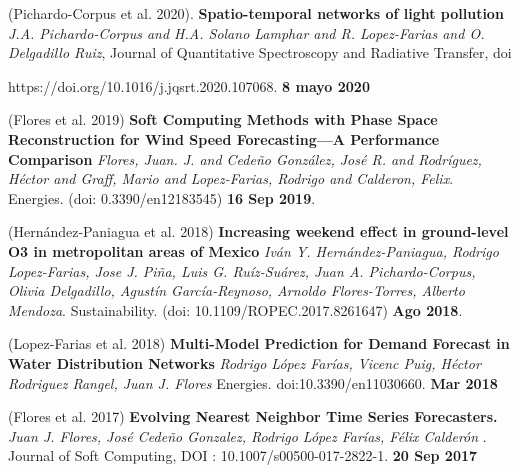 \documentclass[10pt]{article}
\newenvironment{innerlist}[1][\enskip\textbullet]%
        {\begin{compactitem}[#1]}{\end{compactitem}}
\begin{document}
\begin{innerlist}

\item (Pichardo-Corpus et al. 2020). \textbf{Spatio-temporal networks of light pollution} \textit{J.A. Pichardo-Corpus and H.A. Solano Lamphar and R. Lopez-Farias and O. Delgadillo Ruiz}, Journal of Quantitative Spectroscopy and Radiative Transfer, doi 

https://doi.org/10.1016/j.jqsrt.2020.107068. \textbf{8 mayo 2020}

\item (Flores et al. 2019) \textbf{Soft Computing Methods with Phase Space Reconstruction for Wind Speed Forecasting—A Performance Comparison} \textit{{Flores, Juan. J. and Cedeño González, José R. and Rodríguez, Héctor and Graff, Mario and Lopez-Farias, Rodrigo and Calderon, Felix}}. {Energies}. (doi: 0.3390/en12183545) \textbf{16 Sep 2019}.

\item (Hernández-Paniagua et al. 2018) \textbf{Increasing weekend effect in ground-level O3 in metropolitan areas of Mexico} \textit{Iván Y. Hernández-Paniagua, Rodrigo Lopez-Farias, Jose J. Piña, Luis G. Ruíz-Suárez, Juan A. Pichardo-Corpus, Olivia Delgadillo, Agustín García-Reynoso, Arnoldo Flores-Torres, Alberto Mendoza}. {Sustainability}. (doi: 10.1109/ROPEC.2017.8261647) \textbf{Ago 2018}.

\item (Lopez-Farias et al. 2018) \textbf{Multi-Model Prediction for Demand Forecast in
Water Distribution Networks} \textit{Rodrigo López Farías, Vicenc Puig, Héctor Rodriguez Rangel, Juan J. Flores} {Energies}. doi:10.3390/en11030660. \textbf{Mar 2018}

\item  (Flores et al. 2017) \textbf{Evolving Nearest Neighbor Time Series Forecasters.} \textit{Juan J. Flores, José Cede\~no Gonzalez, Rodrigo López Farías, Félix Calderón }.  {Journal of Soft Computing},
DOI : 10.1007/s00500-017-2822-1. \textbf{20 Sep 2017}


\end{innerlist}
\end{document}
